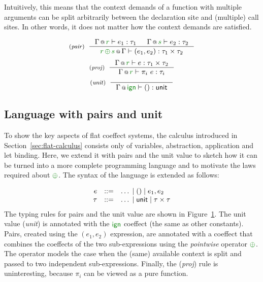 \noindent
Intuitively, this means that the context demands of a function with multiple arguments can be
split arbitrarily between the declaration site and (multiple) call sites. In other words, it does
not matter how the context demands are satisfied.


\begin{figure}[t]
\begin{equation*}
\tyrule{pair}
  {\coctx{\Gamma}{\cclrd{r}} \vdash e_1 : \tau_1 & \coctx{\Gamma}{\cclrd{s}} \vdash e_2 : \tau_2}
  {\coctx{\cclrd{r}\,\cpar\,\cclrd{s}}{\Gamma} \vdash (e_1, e_2) : \tau_1 \times \tau_2 }
\end{equation*}
\begin{equation*}
\tyrule{proj}
  {\coctx{\Gamma}{\cclrd{r}} \vdash e : \tau_1 \times \tau_2 }
  {\coctx{\Gamma}{\cclrd{r}} \vdash \pi_i~e : \tau_{i} }
\end{equation*}
\begin{equation*}
\tyrule{unit}
  {}
  {\coctx{\Gamma}{\czero} \vdash () : \ident{unit} }
\end{equation*}

\label{fig:flat-ext-types}
\end{figure}


\subsection{Language with pairs and unit}
\label{sec:flat-exts-tup}

To show the key aspects of flat coeffect systems, the calculus introduced in Section~\ref{sec:flat-calculus}
consists only of variables, abstraction, application and let binding. Here, we extend it
with pairs and the unit value to sketch how it can be turned into a more complete programming
language and to motivate the laws required about $\cpar$. The syntax of the language is extended as follows:

\noindent
\begin{equation*}
\begin{array}{rcl}
e &::=& \ldots \sep () \sep e_1, e_2 \\
\tau &::=& \ldots \sep \ident{unit} \sep \tau \times \tau
\end{array}
\end{equation*}
%
The typing rules for pairs and the unit value are shown in Figure~\ref{fig:flat-ext-types}.
The unit value (\emph{unit}) is annotated with the $\czero$ coeffect (the same as other constants).
Pairs, created using the $(e_1, e_2)$ expression, are annotated with a coeffect that combines
the coeffects of the two sub-expressions using the \emph{pointwise} operator $\cpar$. The operator
models the case when the (same) available context is split and passed to two independent
sub-expressions. Finally, the (\emph{proj}) rule is uninteresting, because $\pi_i$ can be
viewed as a pure function.

